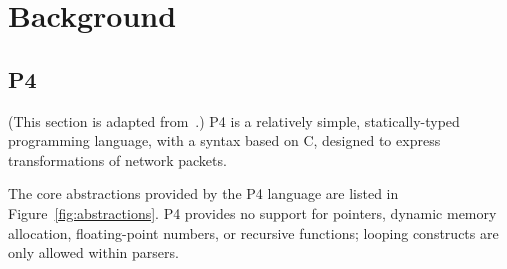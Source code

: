 \section{Background}\label{sec:bacground}

\subsection{P4}

(This section is adapted from~\cite{budiu-osr17}.)  P4 is a relatively
simple, statically-typed programming language, with a syntax based on
C, designed to express transformations of network packets.

The core abstractions provided by the P4 language are listed in
Figure~\ref{fig:abstractions}.  P4 provides no support for pointers,
dynamic memory allocation, floating-point numbers, or recursive
functions; looping constructs are only allowed within parsers.

